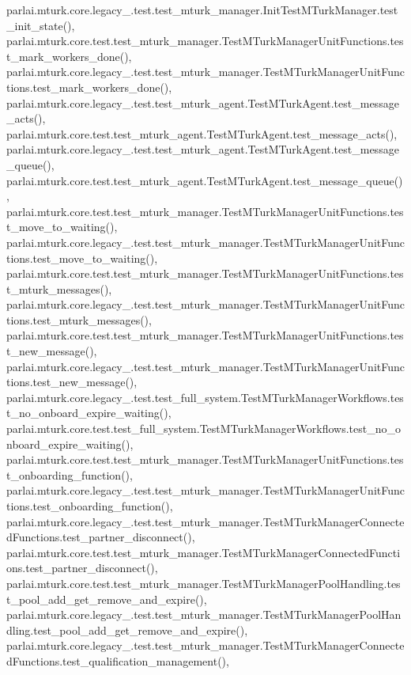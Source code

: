 parlai.\+mturk.\+core.\+legacy\+\_.\+test.\+test\+\_\+mturk\+\_\+manager.\+Init\+Test\+M\+Turk\+Manager.\+test\+\_\+init\+\_\+state(), parlai.\+mturk.\+core.\+test.\+test\+\_\+mturk\+\_\+manager.\+Test\+M\+Turk\+Manager\+Unit\+Functions.\+test\+\_\+mark\+\_\+workers\+\_\+done(), parlai.\+mturk.\+core.\+legacy\+\_.\+test.\+test\+\_\+mturk\+\_\+manager.\+Test\+M\+Turk\+Manager\+Unit\+Functions.\+test\+\_\+mark\+\_\+workers\+\_\+done(), parlai.\+mturk.\+core.\+legacy\+\_.\+test.\+test\+\_\+mturk\+\_\+agent.\+Test\+M\+Turk\+Agent.\+test\+\_\+message\+\_\+acts(), parlai.\+mturk.\+core.\+test.\+test\+\_\+mturk\+\_\+agent.\+Test\+M\+Turk\+Agent.\+test\+\_\+message\+\_\+acts(), parlai.\+mturk.\+core.\+legacy\+\_.\+test.\+test\+\_\+mturk\+\_\+agent.\+Test\+M\+Turk\+Agent.\+test\+\_\+message\+\_\+queue(), parlai.\+mturk.\+core.\+test.\+test\+\_\+mturk\+\_\+agent.\+Test\+M\+Turk\+Agent.\+test\+\_\+message\+\_\+queue(), parlai.\+mturk.\+core.\+test.\+test\+\_\+mturk\+\_\+manager.\+Test\+M\+Turk\+Manager\+Unit\+Functions.\+test\+\_\+move\+\_\+to\+\_\+waiting(), parlai.\+mturk.\+core.\+legacy\+\_.\+test.\+test\+\_\+mturk\+\_\+manager.\+Test\+M\+Turk\+Manager\+Unit\+Functions.\+test\+\_\+move\+\_\+to\+\_\+waiting(), parlai.\+mturk.\+core.\+test.\+test\+\_\+mturk\+\_\+manager.\+Test\+M\+Turk\+Manager\+Unit\+Functions.\+test\+\_\+mturk\+\_\+messages(), parlai.\+mturk.\+core.\+legacy\+\_.\+test.\+test\+\_\+mturk\+\_\+manager.\+Test\+M\+Turk\+Manager\+Unit\+Functions.\+test\+\_\+mturk\+\_\+messages(), parlai.\+mturk.\+core.\+test.\+test\+\_\+mturk\+\_\+manager.\+Test\+M\+Turk\+Manager\+Unit\+Functions.\+test\+\_\+new\+\_\+message(), parlai.\+mturk.\+core.\+legacy\+\_.\+test.\+test\+\_\+mturk\+\_\+manager.\+Test\+M\+Turk\+Manager\+Unit\+Functions.\+test\+\_\+new\+\_\+message(), parlai.\+mturk.\+core.\+legacy\+\_.\+test.\+test\+\_\+full\+\_\+system.\+Test\+M\+Turk\+Manager\+Workflows.\+test\+\_\+no\+\_\+onboard\+\_\+expire\+\_\+waiting(), parlai.\+mturk.\+core.\+test.\+test\+\_\+full\+\_\+system.\+Test\+M\+Turk\+Manager\+Workflows.\+test\+\_\+no\+\_\+onboard\+\_\+expire\+\_\+waiting(), parlai.\+mturk.\+core.\+test.\+test\+\_\+mturk\+\_\+manager.\+Test\+M\+Turk\+Manager\+Unit\+Functions.\+test\+\_\+onboarding\+\_\+function(), parlai.\+mturk.\+core.\+legacy\+\_.\+test.\+test\+\_\+mturk\+\_\+manager.\+Test\+M\+Turk\+Manager\+Unit\+Functions.\+test\+\_\+onboarding\+\_\+function(), parlai.\+mturk.\+core.\+legacy\+\_.\+test.\+test\+\_\+mturk\+\_\+manager.\+Test\+M\+Turk\+Manager\+Connected\+Functions.\+test\+\_\+partner\+\_\+disconnect(), parlai.\+mturk.\+core.\+test.\+test\+\_\+mturk\+\_\+manager.\+Test\+M\+Turk\+Manager\+Connected\+Functions.\+test\+\_\+partner\+\_\+disconnect(), parlai.\+mturk.\+core.\+test.\+test\+\_\+mturk\+\_\+manager.\+Test\+M\+Turk\+Manager\+Pool\+Handling.\+test\+\_\+pool\+\_\+add\+\_\+get\+\_\+remove\+\_\+and\+\_\+expire(), parlai.\+mturk.\+core.\+legacy\+\_.\+test.\+test\+\_\+mturk\+\_\+manager.\+Test\+M\+Turk\+Manager\+Pool\+Handling.\+test\+\_\+pool\+\_\+add\+\_\+get\+\_\+remove\+\_\+and\+\_\+expire(), parlai.\+mturk.\+core.\+legacy\+\_.\+test.\+test\+\_\+mturk\+\_\+manager.\+Test\+M\+Turk\+Manager\+Connected\+Functions.\+test\+\_\+qualification\+\_\+management(), 